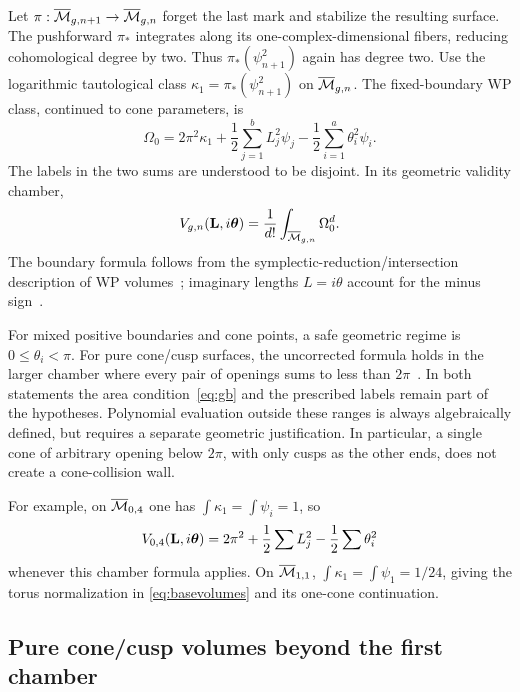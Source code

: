 Let $\pi:\overline{\mathcal M}_{g,n+1}\to\overline{\mathcal M}_{g,n}$ forget the last mark and
stabilize the resulting surface. The pushforward $\pi_*$ integrates
along its one-complex-dimensional fibers, reducing cohomological
degree by two. Thus $\pi_*(\psi_{n+1}^2)$ again has degree two.
Use the logarithmic tautological class
$\kappa_1=\pi_*(\psi_{n+1}^2)$ on $\overline{\mathcal M}_{g,n}$. The fixed-boundary WP class,
continued to cone parameters, is
\begin{equation}
 \Omega_0=2\pi^2\kappa_1+\frac12\sum_{j=1}^{b}L_j^2\psi_j
                          -\frac12\sum_{i=1}^{a}\theta_i^2\psi_i.
 \label{eq:wpclass}
\end{equation}
The labels in the two sums are understood to be disjoint. In its geometric
validity chamber,
\begin{equation}
 V_{g,n}(\mathbf L,i\boldsymbol\theta)=\frac1{d!}
                          \int_{\overline{\mathcal M}_{g,n}}\Omega_0^d.
 \label{eq:intersectionvolume}
\end{equation}
The boundary formula follows from the symplectic-reduction/intersection
description of WP volumes~\cite{MirzIntersection}; imaginary lengths
$L=i\theta$ account for the minus sign~\cite{DoNorbury}.

For mixed positive boundaries and cone points, a safe geometric regime is
$0\le\theta_i<\pi$. For pure cone/cusp surfaces, the uncorrected formula
holds in the larger chamber where every pair of openings sums to less than
$2\pi$~\cite[Theorem 1.1 and Corollary 1.2]{AnagnostouNorbury}.
In both statements the area condition~\eqref{eq:gb} and the prescribed
labels remain part of the hypotheses. Polynomial evaluation outside these
ranges is always algebraically defined, but requires a separate geometric
justification. In particular, a single cone of arbitrary
opening below $2\pi$, with only cusps as the other ends, does not create a
cone-collision wall.

For example, on $\overline{\mathcal M}_{0,4}$ one has
$\int\kappa_1=\int\psi_i=1$, so
\begin{equation}
 V_{0,4}(\mathbf L,i\boldsymbol\theta)
 =2\pi^2+\frac12\sum L_j^2-\frac12\sum\theta_i^2
 \label{eq:mixedv04}
\end{equation}
whenever this chamber formula applies. On $\overline{\mathcal M}_{1,1}$,
$\int\kappa_1=\int\psi_1=1/24$, giving the torus normalization in
\eqref{eq:basevolumes} and its one-cone continuation.

\subsection{Pure cone/cusp volumes beyond the first chamber}

